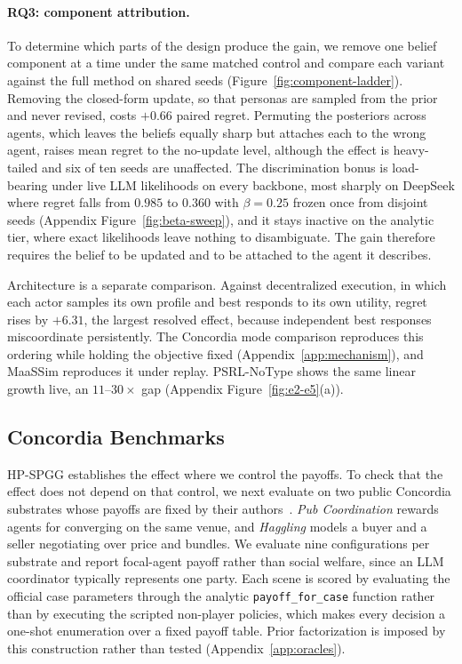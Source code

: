 \documentclass[letterpaper]{article} %
\begin{document}
\paragraph{RQ3: component attribution.} To determine which parts of the design produce the gain, we remove one belief component at a time under the same matched control and compare each variant against the full method on shared seeds (Figure~\ref{fig:component-ladder}). Removing the closed-form update, so that personas are sampled from the prior and never revised, costs $+0.66$ paired regret. Permuting the posteriors across agents, which leaves the beliefs equally sharp but attaches each to the wrong agent, raises mean regret to the no-update level, although the effect is heavy-tailed and six of ten seeds are unaffected. The discrimination bonus is load-bearing under live LLM likelihoods on every backbone, most sharply on DeepSeek where regret falls from $0.985$ to $0.360$ with $\beta{=}0.25$ frozen once from disjoint seeds (Appendix Figure~\ref{fig:beta-sweep}), and it stays inactive on the analytic tier, where exact likelihoods leave nothing to disambiguate. The gain therefore requires the belief to be updated and to be attached to the agent it describes.

Architecture is a separate comparison. Against decentralized execution, in which each actor samples its own profile and best responds to its own utility, regret rises by $+6.31$, the largest resolved effect, because independent best responses miscoordinate persistently. The Concordia mode comparison reproduces this ordering while holding the objective fixed (Appendix~\ref{app:mechanism}), and MaaSSim reproduces it under replay. PSRL-NoType shows the same linear growth live, an $11$--$30\times$ gap (Appendix Figure~\ref{fig:e2-e5}(a)).

\subsection{Concordia Benchmarks}
\label{sec:concordia}

HP-SPGG establishes the effect where we control the payoffs. To check that the effect does not depend on that control, we next evaluate on two public Concordia substrates whose payoffs are fixed by their authors~\citep{vezhnevets2023generative,smith2026evaluating}. \emph{Pub Coordination} rewards agents for converging on the same venue, and \emph{Haggling} models a buyer and a seller negotiating over price and bundles. We evaluate nine configurations per substrate and report focal-agent payoff rather than social welfare, since an LLM coordinator typically represents one party. Each scene is scored by evaluating the official case parameters through the analytic \texttt{payoff\_for\_case} function rather than by executing the scripted non-player policies, which makes every decision a one-shot enumeration over a fixed payoff table. Prior factorization is imposed by this construction rather than tested (Appendix~\ref{app:oracles}).
\end{document}
